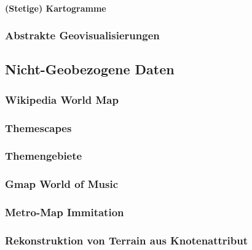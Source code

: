                 \paragraph{(Stetige) Kartogramme} %

            \subsubsection{Abstrakte Geovisualisierungen} %

        \subsection{Nicht-Geobezogene Daten} %

            \subsubsection{Wikipedia World Map} %

            \subsubsection{Themescapes} %

            \subsubsection{Themengebiete} %

            \subsubsection{Gmap World of Music} %

            \subsubsection{Metro-Map Immitation} %

            \subsubsection{Rekonstruktion von Terrain aus Knotenattribut} %

